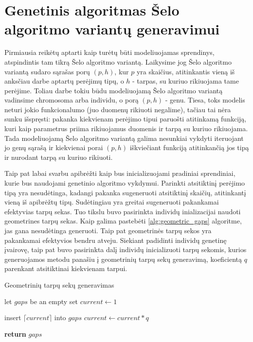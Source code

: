 \documentclass{VUMIFInfBakalaurinis}
\begin{document}
\section{Genetinis algoritmas Šelo algoritmo variantų generavimui}


Pirmiausia reikėtų aptarti kaip turėtų būti modeliuojamas sprendinys, atspindintis tam tikrą Šelo algoritmo variantą.
Laikysime jog Šelo algoritmo variantą sudaro sąrašas porų $(p, h)$, kur $p$ yra skaičius, atitinkantis vieną iš anksčiau darbe aptartų perėjimų tipų,
o $h$ - tarpas, su kuriuo rikiuojama tame perėjime.
Toliau darbe tokiu būdu modeliuojamą Šelo algoritmo variantą vadinsime chromosoma arba individu, o porą $(p, h)$ - genu.
Tiesa, toks modelis neturi jokio funkcionalumo (juo duomenų rikiuoti negalime), tačiau tai nėra sunku išspręsti: pakanka kiekvienam perėjimo tipui
paruošti atitinkamą funkciją, kuri kaip parametrus priima rikiuojamus duomenis ir tarpą su kuriuo rikiuojama.
Tada modeliuojamą Šelo algoritmo variantą galima nesunkiai vykdyti iteruojant jo genų sąrašą ir kiekvienai porai $(p, h)$ iškviečiant funkciją atitinkančią jos tipą ir nurodant tarpą su kuriuo rikiuoti.

Taip pat labai svarbu apibrėžti kaip bus inicializuojami pradiniai sprendiniai, kurie bus naudojami genetinio algoritmo vykdymui.
Parinkti atsitiktinį perėjimo tipą yra nesudėtinga, kadangi pakanka sugeneruoti atsitiktinį skaičių, atitinkantį vieną iš apibrėžtų tipų.
Sudėtingiau yra greitai sugeneruoti pakankamai efektyvias tarpų sekas.
Tuo tikslu buvo pasirinkta individų inializacijai naudoti geometrines tarpų sekas.
Kaip galima pastebėti \ref{alg:geometric_gaps} algoritme, jas gana nesudėtinga generuoti.
Taip pat geometrinės tarpų sekos yra pakankamai efektyvios bendru atveju.
Siekiant padidinti individų genetinę įvairovę, taip pat buvo pasirinkta dalį individų inicializuoti
tarpų sekomis, kurios generuojamos metodu panašiu į geometrinių tarpų sekų generavimą, koeficientą $q$ parenkant atsitiktinai kiekvienam tarpui.

\begin{algorithm}[H]
  \caption{Geometrinių tarpų sekų generavimas}\label{alg:geometric_gaps}
  \begin{algorithmic}[1]
      \State let $gaps$ be an empty set
      \State $current \gets 1$
      
        \State insert $\lceil current \rceil$ into $gaps$
        \State $current \gets current * q$ 
      \EndWhile

      \State \textbf{return} $gaps$
    \EndProcedure
  \end{algorithmic}
\end{algorithm}
\end{document}
